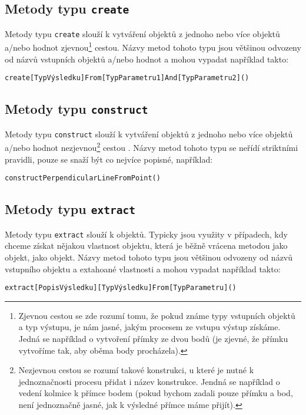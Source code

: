 \subsection[Create]{Metody typu \texttt{create}}
\label{subsec:create-methods}

Metody typu \texttt{create} slouží k vytváření objektů z jednoho nebo více objektů a/nebo hodnot zjevnou\footnote{Zjevnou cestou se zde rozumí tomu, že pokud známe typy vstupních objektů a typ výstupu, je nám jasné, jakým procesem ze vstupu výstup získáme. Jedná se například o vytvoření přímky ze dvou bodů (je zjevné, že přímku vytvoříme tak, aby oběma body procházela).} cestou\cite{geometryjs:wiki:geometryObjects}.
Názvy metod tohoto typu jsou většinou odvozeny od názvů vstupních objektů a/nebo hodnot a mohou vypadat například takto: 

\texttt{create[TypVýsledku]From[TypParametru1]And[TypParametru2]()}

\subsection[Construct]{Metody typu \texttt{construct}}
\label{subsec:construct-methods}

Metody typu \texttt{construct} slouží k vytváření objektů z jednoho nebo více objektů a/nebo hodnot nezjevnou\footnote{Nezjevnou cestou se rozumí takové konstrukci, u které je nutné k jednoznačnosti procesu přidat i název konstrukce. Jendná se například o vedení kolmice k přímce bodem (pokud bychom zadali pouze přímku a bod, není jednoznačně jasné, jak k výsledné přímce máme přijít).} cestou \cite{geometryjs:wiki:geometryObjects}.
Názvy metod tohoto typu se neřídí striktními pravidli, pouze se snaží být co nejvíce popisné, například:

\texttt{constructPerpendicularLineFromPoint()}

\subsection[Extract]{Metody typu \texttt{extract}}
\label{subsec:extract-methods}

Metody typu \texttt{extract} slouží k  objektů.
Typicky jsou využity v případech, kdy chceme získat nějakou vlastnost objektu, která je běžně vrácena metodou jako  objekt, jako  objekt\cite{geometryjs:wiki:geometryObjects}.
Názvy metod tohoto typu jsou většinou odvozeny od názvů vstupního objektu a extahoané vlastnosti a mohou vypadat například takto:

\texttt{extract[PopisVýsledku][TypVýsledku]From[TypParametru]()}